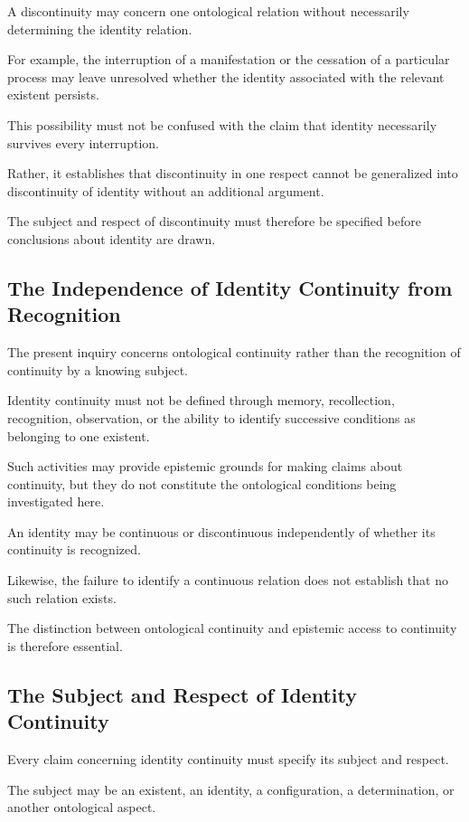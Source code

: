 A discontinuity may concern one ontological
relation without necessarily determining
the identity relation.

For example, the interruption of a
manifestation or the cessation of a
particular process may leave unresolved
whether the identity associated with
the relevant existent persists.

This possibility must not be confused
with the claim that identity necessarily
survives every interruption.

Rather, it establishes that discontinuity
in one respect cannot be generalized
into discontinuity of identity without
an additional argument.

The subject and respect of discontinuity
must therefore be specified before
conclusions about identity are drawn.

\subsection{The Independence of Identity Continuity from Recognition}

The present inquiry concerns ontological
continuity rather than the recognition
of continuity by a knowing subject.

Identity continuity must not be defined
through memory, recollection, recognition,
observation, or the ability to identify
successive conditions as belonging to
one existent.

Such activities may provide epistemic
grounds for making claims about continuity,
but they do not constitute the ontological
conditions being investigated here.

An identity may be continuous or
discontinuous independently of whether
its continuity is recognized.

Likewise, the failure to identify a
continuous relation does not establish
that no such relation exists.

The distinction between ontological
continuity and epistemic access to
continuity is therefore essential.

\subsection{The Subject and Respect of Identity Continuity}

Every claim concerning identity continuity
must specify its subject and respect.

The subject may be an existent, an identity,
a configuration, a determination, or
another ontological aspect.

